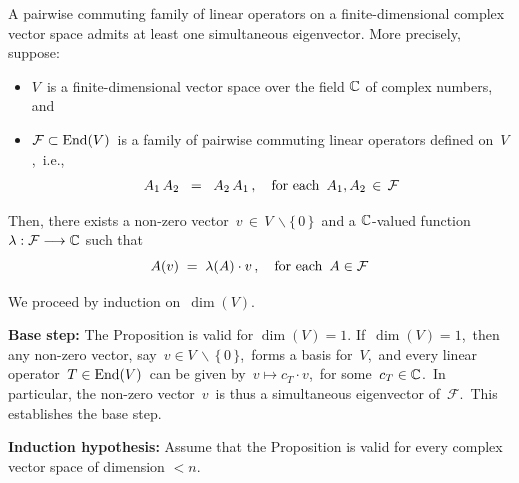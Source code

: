 
\vskip 0.5cm
\begin{proposition}
\mbox{}
\vskip 0.1cm
\noindent
A pairwise commuting family of linear operators on a finite-dimensional
complex vector space admits at least one simultaneous eigenvector.
More precisely, suppose:
\begin{itemize}
\item
    $V$\, is a finite-dimensional vector space over the field $\mathbb{C}$ of complex numbers, and
\item
    $\mathcal{F} \subset \textnormal{End}(V)$\, is a family of pairwise commuting linear operators defined on \,$V$,\, i.e.,
    \begin{equation*}
    A_{1}\,A_{2} \;\; = \;\; A_{2}\,A_{1}\,,
    \quad
    \textnormal{for each \,$A_{1}, A_{2} \,\in\,\mathcal{F}$}
    \end{equation*}
\end{itemize}
Then, there exists a non-zero vector \,$v \,\in\, V\,\backslash\{\,0\,\}$\,
and a $\mathbb{C}$-valued function $\lambda : \mathcal{F} \longrightarrow \mathbb{C}$
such that
\begin{equation*}
A(v) \; = \; \lambda({A}) \cdot v\,,
\quad
\textnormal{for each \,$A \in \mathcal{F}$}
\end{equation*}
\end{proposition}
\proof
We proceed by induction on \,$\dim(V)$.\,

\vskip 0.3cm
\noindent
\textbf{Base step:}\; The Proposition is valid for $\dim(V) = 1$.
\vskip 0.1cm
\noindent
If \,$\dim(V) = 1$,\, then any non-zero vector, say \,$v \in V\,\backslash\,\{\,0\,\}$,\,
forms a basis for \,$V$,\, and every linear operator \,$T \in \textnormal{End}(V)$\, can be given by
\,$v \longmapsto c_{T} \cdot v$,\, for some \,$c_{T} \in \mathbb{C}$.\,
In particular, the non-zero vector \,$v$\, is thus a simultaneous eigenvector of \,$\mathcal{F}$.\,
This establishes the base step.

\vskip 0.3cm
\noindent
\textbf{Induction hypothesis:}\;
Assume that the Proposition is valid for every complex vector space of dimension $< n$.

